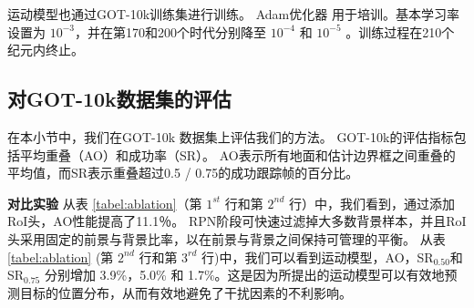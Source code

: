运动模型也通过GOT-10k训练集进行训练。 Adam优化器 \cite{kingma2014adam} 用于培训。基本学习率设置为 $10^{-3}$，并在第170和200个时代分别降至 $10^{-4}$ 和 $10^{-5}$ 。训练过程在210个纪元内终止。

\subsection{对GOT-10k数据集的评估}
在本小节中，我们在GOT-10k \cite{GOT-10k} 数据集上评估我们的方法。
GOT-10k的评估指标包括平均重叠（AO）和成功率（SR）。 AO表示所有地面和估计边界框之间重叠的平均值，而SR表示重叠超过0.5 / 0.75的成功跟踪帧的百分比。

\textbf{对比实验}
从表 \ref{tabel:ablation}（第 $1^{st}$ 行和第 $2^{nd}$ 行）中，我们看到，通过添加RoI头，AO性能提高了11.1％。 RPN阶段可快速过滤掉大多数背景样本，并且RoI头采用固定的前景与背景比率，以在前景与背景之间保持可管理的平衡。
从表 \ref{tabel:ablation} (第 $2^{nd}$ 行和第 $3^{rd}$ 行)中，我们可以看到运动模型，AO，SR$_{0.50}$和SR$_{0.75}$ 分别增加 3.9\%，5.0\% 和 1.7\%。这是因为所提出的运动模型可以有效地预测目标的位置分布，从而有效地避免了干扰因素的不利影响。

